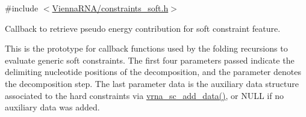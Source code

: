 {\ttfamily \#include $<$\hyperlink{constraints__soft_8h}{Vienna\+R\+N\+A/constraints\+\_\+soft.\+h}$>$}



Callback to retrieve pseudo energy contribution for soft constraint feature. 

This is the prototype for callback functions used by the folding recursions to evaluate generic soft constraints. The first four parameters passed indicate the delimiting nucleotide positions of the decomposition, and the parameter {\ttfamily denotes} the decomposition step. The last parameter {\ttfamily data} is the auxiliary data structure associated to the hard constraints via \hyperlink{group__soft__constraints_ga15c6d52471ec97897e2bb7f964f5deb6}{vrna\+\_\+sc\+\_\+add\+\_\+data()}, or N\+U\+LL if no auxiliary data was added.

